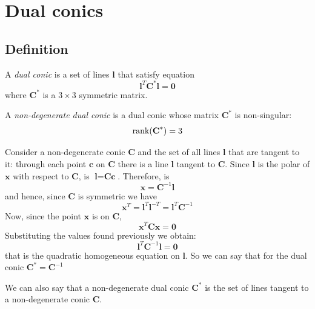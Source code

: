 \documentclass[12pt, a4paper]{report}
\newtheorem[style=M,bodystyle=\normalfont]{theorem}{Theorem}
\newtheorem[style=M,bodystyle=\normalfont]{corollary}{Corollary}
\newtheorem[style=M,bodystyle=\normalfont]{lemma}{Lemma}
\newtheorem[style=M,bodystyle=\normalfont]{definition}{Definition}
\begin{document}
    \section{Dual conics}
    \subsection{Definition}
    \begin{definition}
        A \emph{dual conic} is a set of lines $\textbf{l}$ that satisfy equation
        \[\textbf{l}^T\textbf{C}^{*}\textbf{l}=\textbf{0}\]
        where $\textbf{C}^{*}$ is a $3 \times 3$ symmetric matrix.

        A \emph{non-degenerate dual conic} is a dual conic whose matrix $\textbf{C}^{*}$ is non-singular: 
        \[\textnormal{rank}(\textbf{C}^{*})=3\]
    \end{definition}
    Consider a non-degenerate conic $\textbf{C}$ and the set of all lines $\textbf{l}$ that are tangent to it: through each point $\textbf{c}$ on $\textbf{C}$ there is a line 
    $\textbf{l}$ tangent to $\textbf{C}$. Since $\textbf{l}$ is the polar of $\textbf{x}$ with respect to $\textbf{C}$, is $\textbf{l}=\textbf{Cc}$. Therefore, is
    \[\textbf{x}=\textbf{C}^{-1}\textbf{l}\]
    and hence, since $\textbf{C}$ is symmetric we have 
    \[\textbf{x}^T=\textbf{l}^T\textbf{l}^{-T}=\textbf{l}^T\textbf{C}^{-1}\]
    Now, since the point $\textbf{x}$ is on $\textbf{C}$,
    \[\textbf{x}^T\textbf{C}\textbf{x}=\textbf{0}\]
    Substituting the values found previously we obtain: 
    \[\textbf{l}^T\textbf{C}^{-1}\textbf{l}=\textbf{0}\]
    that is the quadratic homogeneous equation on $\textbf{l}$. So we can say that for the dual conic $\textbf{C}^{*}=\textbf{C}^{-1}$

    We can also say that a non-degenerate dual conic $\textbf{C}^{*}$ is the set of lines tangent to a non-degenerate conic $\textbf{C}$. 
\end{document}
